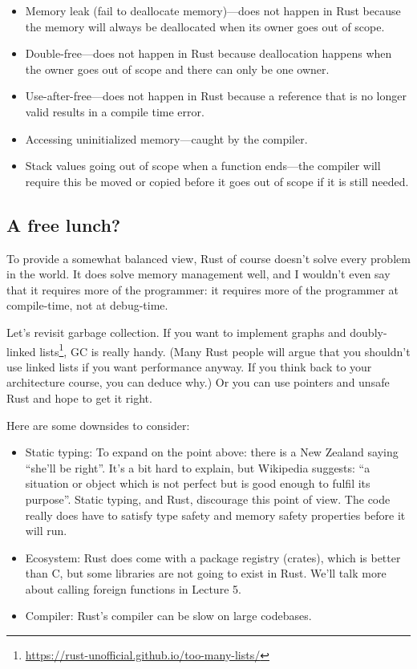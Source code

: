 \documentclass[a4paper]{report}
\newcommand{\CPP}{C\nolinebreak\hspace{-.05em}\raisebox{.4ex}{\tiny\bf +}\nolinebreak\hspace{-.10em}\raisebox{.4ex}{\tiny\bf +}}
\def\CPP{{C\nolinebreak[4]\hspace{-.05em}\raisebox{.4ex}{\tiny\bf ++}}}
\begin{document}
\begin{itemize}
	\item Memory leak (fail to deallocate memory)---does not happen in Rust because the memory will always be deallocated when its owner goes out of scope.
	\item Double-free---does not happen in Rust because deallocation happens when the owner goes out of scope and there can only be one owner.
	\item Use-after-free---does not happen in Rust because a reference that is no longer valid results in a compile time error.
	\item Accessing uninitialized memory---caught by the compiler.
	\item Stack values going out of scope when a function ends---the compiler will require this be moved or copied before it goes out of scope if it is still needed.
\end{itemize}

\subsection*{A free lunch?}
To provide a somewhat balanced view, Rust of course doesn't solve every problem
in the world. It does solve memory management well, and I wouldn't even say that
it requires more of the programmer: it requires more of the programmer at compile-time,
not at debug-time.

Let's revisit garbage collection. If you want
to implement graphs and doubly-linked lists\footnote{\url{https://rust-unofficial.github.io/too-many-lists/}}, GC is really handy. (Many
Rust people will argue that you shouldn't use linked lists if you want
performance anyway. If you think back to your architecture course, you
can deduce why.) Or you can use pointers and unsafe Rust and hope to
get it right.


Here are some downsides to consider:
\begin{itemize}
\item Static typing: To expand on the point above: there is a New Zealand saying ``she'll be right''. It's a bit hard to explain, but Wikipedia suggests: ``a situation or object which is not perfect but is good enough to fulfil its purpose''. Static typing, and Rust, discourage this point of view. The code really does have to satisfy type safety and memory safety properties before it will run.
\item Ecosystem: Rust does come with a package registry (crates), which is better than \CPP, but some libraries are not going to exist in Rust. We'll talk more about calling foreign functions in Lecture 5.
\item Compiler: Rust's compiler can be slow on large codebases.
\end{itemize}
\end{document}
